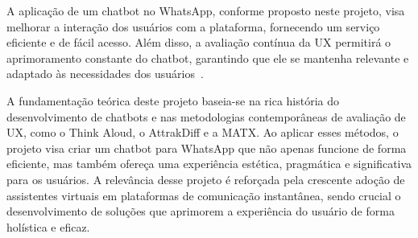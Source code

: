 A aplicação de um chatbot no WhatsApp, conforme proposto neste projeto, visa melhorar a interação dos usuários com a plataforma, fornecendo um serviço eficiente e de fácil acesso. Além disso, a avaliação contínua da UX permitirá o aprimoramento constante do chatbot, garantindo que ele se mantenha relevante e adaptado às necessidades dos usuários~\cite{Oracle2024}.

A fundamentação teórica deste projeto baseia-se na rica história do desenvolvimento de chatbots e nas metodologias contemporâneas de avaliação de UX, como o Think Aloud, o AttrakDiff e a MATX. Ao aplicar esses métodos, o projeto visa criar um chatbot para WhatsApp que não apenas funcione de forma eficiente, mas também ofereça uma experiência estética, pragmática e significativa para os usuários. A relevância desse projeto é reforçada pela crescente adoção de assistentes virtuais em plataformas de comunicação instantânea, sendo crucial o desenvolvimento de soluções que aprimorem a experiência do usuário de forma holística e eficaz.
